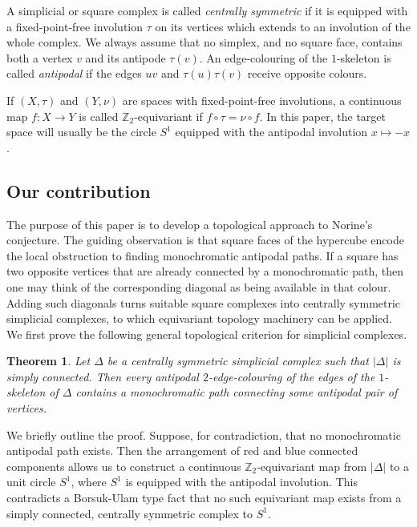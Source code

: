\documentclass[12pt,UKenglish]{amsart}
\theoremstyle{plain}
\newtheorem{theorem}{Theorem}[section]
\theoremstyle{definition}
\theoremstyle{remark}
\begin{document}
A simplicial or square complex is called \emph{centrally symmetric} if it is equipped with a fixed-point-free involution $\tau$ on its vertices which extends to an involution of the whole complex. We always assume that no simplex, and no square face, contains both a vertex $v$ and its antipode $\tau(v)$. An edge-colouring of the $1$-skeleton is called \emph{antipodal} if the edges $uv$ and $\tau(u)\tau(v)$ receive opposite colours.

If $(X,\tau)$ and $(Y,\nu)$ are spaces with fixed-point-free involutions, a continuous map $f:X\to Y$ is called $\mathbb Z_2$-equivariant if \(f\circ \tau=\nu\circ f\). In this paper, the target space will usually be the circle $S^1$ equipped with the antipodal involution $x\mapsto -x$.

\subsection*{Our contribution} The purpose of this paper is to develop a topological approach to Norine's conjecture. The guiding observation is that square faces of the hypercube encode the local obstruction to finding monochromatic antipodal paths. If a square has two opposite vertices that are already connected by a monochromatic path, then one may think of the corresponding diagonal as being available in that colour. Adding such diagonals turns suitable square complexes into centrally symmetric simplicial complexes, to which equivariant topology machinery can be applied. We first prove the following general topological criterion for simplicial complexes.

\begin{theorem}\label{thm:triangulated_squares}
 Let \(\Delta\) be a centrally symmetric simplicial complex such that \(|\Delta|\) is simply connected. Then every antipodal \(2\)-edge-colouring of the edges of the \(1\)-skeleton of \(\Delta\) contains a monochromatic path connecting some antipodal pair of vertices.
\end{theorem}

We briefly outline the proof. Suppose, for contradiction, that no monochromatic antipodal path exists. Then the arrangement of red and blue connected components allows us to construct a continuous \(\mathbb Z_2\)-equivariant map from \(|\Delta|\) to a unit circle \(S^1\), where \(S^1\) is equipped with the antipodal involution. This contradicts a Borsuk-Ulam type fact that no such equivariant map exists from a simply connected, centrally symmetric complex to \(S^1\).
\end{document}
